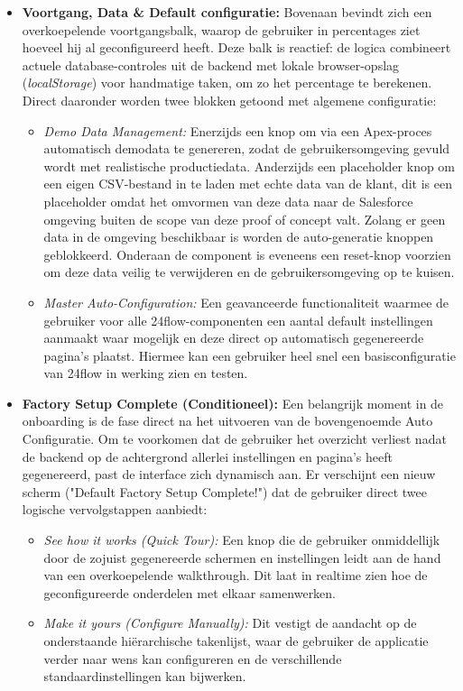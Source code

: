 \begin{itemize}
	\item \textbf{Voortgang, Data \& Default configuratie:} Bovenaan bevindt zich een overkoepelende voortgangsbalk, waarop de gebruiker in percentages ziet hoeveel hij al geconfigureerd heeft. Deze balk is reactief: de logica combineert actuele database-controles uit de backend met lokale browser-opslag (\textit{localStorage}) voor handmatige taken, om zo het percentage te berekenen. Direct daaronder worden twee blokken getoond met algemene configuratie: 
	\begin{itemize}
		\item \textit{Demo Data Management:} Enerzijds een knop om via een Apex-proces automatisch demodata te genereren, zodat de gebruikersomgeving gevuld wordt met realistische productiedata. Anderzijds een placeholder knop om een eigen CSV-bestand in te laden met echte data van de klant, dit is een placeholder omdat het omvormen van deze data naar de Salesforce omgeving buiten de scope van deze proof of concept valt. Zolang er geen data in de omgeving beschikbaar is worden de auto-generatie knoppen geblokkeerd. Onderaan de component is eveneens een reset-knop voorzien om deze data veilig te verwijderen en de gebruikersomgeving op te kuisen.
		\item \textit{Master Auto-Configuration:} Een geavanceerde functionaliteit waarmee de gebruiker voor alle 24flow-componenten een aantal default instellingen aanmaakt waar mogelijk en deze direct op automatisch gegenereerde pagina's plaatst. Hiermee kan een gebruiker heel snel een basisconfiguratie van 24flow in werking zien en testen.
	\end{itemize}
\clearpage
	
	\item \textbf{Factory Setup Complete (Conditioneel):} Een belangrijk moment in de onboarding is de fase direct na het uitvoeren van de bovengenoemde Auto Configuratie. Om te voorkomen dat de gebruiker het overzicht verliest nadat de backend op de achtergrond allerlei instellingen en pagina's heeft gegenereerd, past de interface zich dynamisch aan. Er verschijnt een nieuw scherm ("Default Factory Setup Complete!") dat de gebruiker direct twee logische vervolgstappen aanbiedt:
	\begin{itemize}
		\item \textit{See how it works (Quick Tour):} Een knop die de gebruiker onmiddellijk door de zojuist gegenereerde schermen en instellingen leidt aan de hand van een overkoepelende walkthrough. Dit laat in realtime zien hoe de geconfigureerde onderdelen met elkaar samenwerken.
		\item \textit{Make it yours (Configure Manually):} Dit vestigt de aandacht  op de onderstaande hiërarchische takenlijst, waar de gebruiker de applicatie verder naar wens kan configureren en de verschillende standaardinstellingen kan bijwerken.
	\end{itemize}
\end{itemize}

